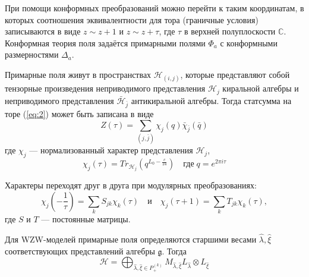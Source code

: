 При помощи конформных преобразований можно перейти к таким координатам, в которых соотношения
эквивалентности для тора (граничные условия) записываются в виде $z\sim z+1$ и $z\sim z+\tau$, где $\tau$ в верхней полуплоскости
$\mathbb{C}$.
Конформная теория поля задаётся примарными полями $\Phi_a$ с конформными размерностями $\Delta_a$.

Примарные поля живут в пространствах $\mathcal{H}_{(i,j)}$, которые представляют собой тензорные
произведения неприводимого представления $\mathcal{H}_j$ киральной алгебры и неприводимого
представления $\bar{\mathcal{H}}_{\bar{j}}$ антикиральной алгебры. Тогда статсумма на торе
(\ref{eq:2}) может быть записана в виде
\begin{equation}
  \label{eq:9}
    Z(\tau)=\sum_{(j,\bar j)}\chi_j(q)\bar \chi_{\bar j}(\bar q)
\end{equation}
где $\chi_j$ --- нормализованный характер представления $\mathcal{H}_j$,
\begin{equation}
  \label{eq:5} \chi_j(\tau)=Tr_{\mathcal{H}_j}(q^{L_0-\frac{c}{24}})\quad \mbox{где}\; q=e^{2\pi i
\tau}
\end{equation}

Характеры переходят друг в друга при модулярных преобразованиях:
\begin{equation}
  \label{eq:107} \chi_j\left(-\frac{1}{\tau}\right)=\sum_k S_{jk}\chi_k(\tau)\quad \mbox{и}\quad
\chi_j(\tau+1)=\sum_kT_{jk}\chi_k(\tau),
\end{equation}
где $S$ и $T$ --- постоянные матрицы. 

Для WZW-моделей примарные поля определяются старшими весами  $\hat \lambda, \hat \xi$ соответствующих представлений алгебры $\mathfrak{g}$. Тогда
\begin{equation}
  \label{eq:6} \mathcal{H}=\bigoplus_{\hat \lambda,\hat \xi\in P^{(k)}_{+}}M_{\hat \lambda,\hat \xi}
L_{\hat \lambda}\otimes L_{\hat \xi}
\end{equation}

